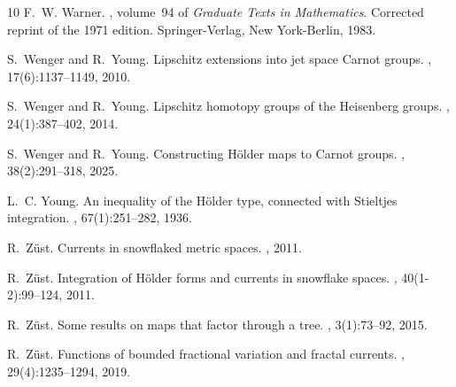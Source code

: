 \documentclass[intlimits,12pt,reqno]{amsart}
\numberwithin{equation}{section}
\theoremstyle{definition}
\begin{document}
\begin{thebibliography}{10}
F.~W. Warner.
,
  volume~94 of {\em Graduate Texts in Mathematics}.
\newblock Corrected reprint of the 1971 edition.
\newblock Springer-Verlag, New York-Berlin, 1983.


S.~Wenger and R.~Young.
\newblock Lipschitz extensions into jet space {C}arnot groups.
, 17(6):1137--1149, 2010.

S.~Wenger and R.~Young.
\newblock Lipschitz homotopy groups of the {H}eisenberg groups.
, 24(1):387--402, 2014.

S.~Wenger and R.~Young.
\newblock Constructing {H}\"{o}lder maps to {C}arnot groups.
, 38(2):291--318, 2025.

L.~C. Young.
\newblock An inequality of the {H}\"{o}lder type, connected with {S}tieltjes
  integration.
, 67(1):251--282, 1936.

R.~Z\"ust.
\newblock Currents in snowflaked metric spaces.
, 2011.

R.~Z\"{u}st.
\newblock Integration of {H}\"{o}lder forms and currents in snowflake spaces.
, 40(1-2):99--124,
  2011.

R.~Z\"{u}st.
\newblock Some results on maps that factor through a tree.
, 3(1):73--92, 2015.

R.~Z\"{u}st.
\newblock Functions of bounded fractional variation and fractal currents.
, 29(4):1235--1294, 2019.

\end{thebibliography}
\end{document}
